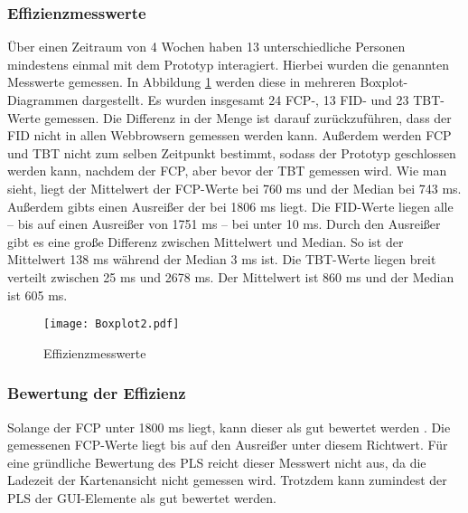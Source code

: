 \subsubsection{Effizienzmesswerte}

Über einen Zeitraum von 4 Wochen haben 13 unterschiedliche Personen mindestens einmal mit dem Prototyp interagiert. Hierbei wurden die genannten Messwerte gemessen. In Abbildung \ref{fig:EfficiencyBoxplot} werden diese in mehreren Boxplot-Diagrammen dargestellt. Es wurden insgesamt 24 \ac{FCP}-, 13 \ac{FID}- und 23 \ac{TBT}-Werte gemessen. Die Differenz in der Menge ist darauf zurückzuführen, dass der \ac{FID} nicht in allen Webbrowsern gemessen werden kann. Außerdem werden \ac{FCP} und \ac{TBT} nicht zum selben Zeitpunkt bestimmt, sodass der Prototyp geschlossen werden kann, nachdem der \ac{FCP}, aber bevor der \ac{TBT} gemessen wird. Wie man sieht, liegt der Mittelwert der \ac{FCP}-Werte bei 760 ms und der Median bei 743 ms. Außerdem gibts einen Ausreißer der bei 1806 ms liegt. Die \ac{FID}-Werte liegen alle – bis auf einen Ausreißer von 1751 ms – bei unter 10 ms. Durch den Ausreißer gibt es eine große Differenz zwischen Mittelwert und Median. So ist der Mittelwert 138 ms während der Median 3 ms ist. Die \ac{TBT}-Werte liegen breit verteilt zwischen 25 ms und 2678 ms. Der Mittelwert ist 860 ms und der Median ist 605 ms.

\begin{figure}[H]
    \caption{Effizienzmesswerte}\label{fig:EfficiencyBoxplot}
    \texttt{[image: Boxplot2.pdf]}
\end{figure}


\subsubsection{Bewertung der Effizienz}
Solange der \ac{FCP} unter 1800 ms liegt, kann dieser als gut bewertet werden \cite{FCP}. Die gemessenen \ac{FCP}-Werte liegt bis auf den Ausreißer unter diesem Richtwert. Für eine gründliche Bewertung des \ac{PLS} reicht dieser Messwert nicht aus, da die Ladezeit der Kartenansicht nicht gemessen wird. Trotzdem kann zumindest der \ac{PLS} der \ac{GUI}-Elemente als gut bewertet werden.

